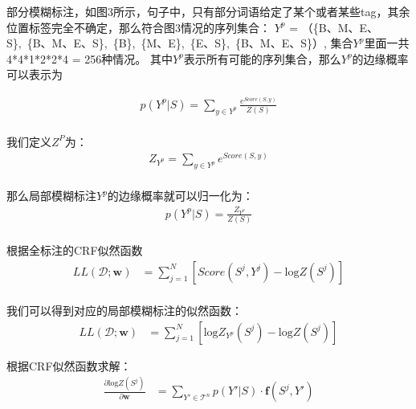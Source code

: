 \documentclass[a4paper, 11pt]{article}
\begin{document}
部分模糊标注，如图3所示，句子中，只有部分词语给定了某个或者某些tag，其余位置标签完全不确定，那么符合图3情况的序列集合：
$Y^p$ = （\{B、M、E、S\},~\{B、M、E、S\},~\{B\},~\{M、E\},~\{E、S\},~\{B、M、E、S\}）,
集合$Y^p$里面一共4*4*1*2*2*4 = 256种情况。
其中$Y^p$表示所有可能的序列集合，那么$Y^p$的边缘概率可以表示为

\begin{equation} \label{eq:CRF_partial_probability}
  \begin{split}
  p(Y^p|S) = \sum_{y \in {Y^p} }\frac{e^{\textit{Score}(S, y)}}{Z(S)} \\
  \end{split}
\end{equation}

我们定义${Z^P}$为：
\begin{equation} \label{eq:CRF_partial_Z_probability}
  \begin{split}
    Z_{Y^p} = \sum_{y \in {Y^p} }{e^{{Score}(S, y)}} \\
  \end{split}
\end{equation}

那么局部模糊标注$Y^p$的边缘概率就可以归一化为：
\begin{equation} \label{eq:CRF_normal_partial__probability}
  \begin{split}
    p(Y^p|S) =  \frac{Z_{Y^p}}{Z(S)} \\
  \end{split}
\end{equation}

根据全标注的CRF似然函数
\begin{equation} \label{eq:ll}
  \begin{split}
    LL(\mathcal{D};\mathbf{w}) &= \sum_{j = 1}^N \left [ \textit{Score}(S^j, Y^j) - \mathrm{log}Z(S^j)\right  ]  \\			
  \end{split}
\end{equation}


我们可以得到对应的局部模糊标注的似然函数：
\begin{equation} \label{eq:partial_ll}
  \begin{split}
    LL(\mathcal{D};\mathbf{w}) &= \sum_{j = 1}^N \left [\mathrm{log}Z_{Y^p}(S^j) - \mathrm{log}Z(S^j)\right ] 
  \end{split}
\end{equation}

根据CRF似然函数求解：
\begin{equation} \label{eq:logz-partial}
  \begin{split}
    \frac{\partial{\mathrm{log}Z(S^j)}}{\partial{\mathbf{w}}} &= \sum_{Y' \in \mathcal{T}^n} p(Y'|S)\cdot \mathbf{f}(S^j, Y') 
  \end{split}
\end{equation}
\end{document}
